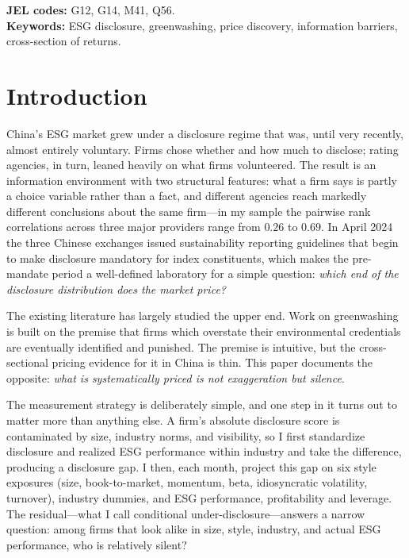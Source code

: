 \documentclass[12pt]{article}
\begin{document}
\begin{titlepage}
\vspace{8pt}
\noindent\textbf{JEL codes:} G12, G14, M41, Q56.\\
\textbf{Keywords:} ESG disclosure, greenwashing, price discovery, information
barriers, cross-section of returns.
\end{titlepage}

\section{Introduction}

China's ESG market grew under a disclosure regime that was, until very
recently, almost entirely voluntary. Firms chose whether and how much to
disclose; rating agencies, in turn, leaned heavily on what firms volunteered.
The result is an information environment with two structural features: what a
firm says is partly a choice variable rather than a fact, and different
agencies reach markedly different conclusions about the same firm---in my
sample the pairwise rank correlations across three major providers range from
$0.26$ to $0.69$. In April 2024 the three Chinese exchanges issued sustainability
reporting guidelines that begin to make disclosure mandatory for index
constituents, which makes the pre-mandate period a well-defined laboratory for
a simple question: \emph{which end of the disclosure distribution does the
market price?}

The existing literature has largely studied the upper end. Work on
greenwashing \citep{yu2020,hu2023} is built on the premise that firms which
overstate their environmental credentials are eventually identified and
punished. The premise is intuitive, but the cross-sectional pricing evidence
for it in China is thin. This paper documents the opposite: \emph{what is
systematically priced is not exaggeration but silence}.

The measurement strategy is deliberately simple, and one step in it turns out
to matter more than anything else. A firm's absolute disclosure score is
contaminated by size, industry norms, and visibility, so I first standardize
disclosure and realized ESG performance within industry and take the
difference, producing a disclosure gap. I then, each month, project this gap on
six style exposures (size, book-to-market, momentum, beta, idiosyncratic
volatility, turnover), industry dummies, and ESG performance, profitability and
leverage. The residual---what I call conditional under-disclosure---answers a
narrow question: among firms that look alike in size, style, industry, and
actual ESG performance, who is relatively silent?
\end{document}
